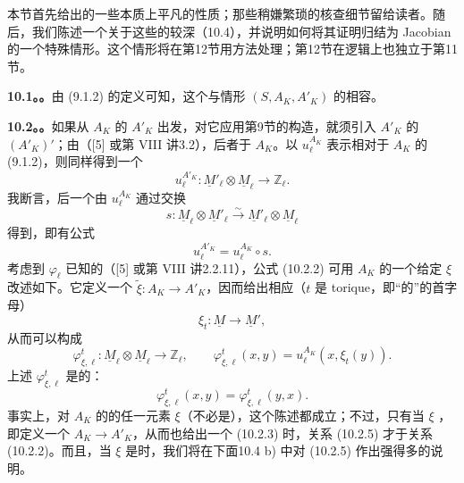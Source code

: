 本节首先给出的一些本质上平凡的性质；那些稍嫌繁琐的核查细节留给读者。随后，我们陈述一个关于这些的较深（10.4），并说明如何将其证明归结为 Jacobian 的一个特殊情形。这个情形将在第12节用方法处理；第12节在逻辑上也独立于第11节。

\textbf{10.1。。}由 (9.1.2) 的定义可知，这个与情形 $(S,A_K,A'_K)$ 的相容。

\textbf{10.2。。}如果从 $A_K$ 的 $A'_K$ 出发，对它应用第9节的构造，就须引入 $A'_K$ 的 $(A'_K)'$；由（[5] 或第 VIII 讲3.2），后者于 $A_K$。以 $u_\ell^{A_K}$ 表示相对于 $A_K$ 的 (9.1.2)，则同样得到一个
\begin{equation}\tag{10.2.1}
 u_\ell^{A'_K}:\underline M'_\ell\otimes\underline M_\ell\longrightarrow\mathbb Z_\ell.
\end{equation}
我断言，后一个由 $u_\ell^{A_K}$ 通过交换
\[
 s:\underline M_\ell\otimes\underline M'_\ell\xrightarrow{\sim}\underline M'_\ell\otimes\underline M_\ell
\]
得到，即有公式
\begin{equation}\tag{10.2.2}
 u_\ell^{A'_K}=u_\ell^{A_K}\circ s.
\end{equation}
考虑到 $\varphi_\ell$ 已知的（[5] 或第 VIII 讲2.2.11），公式 (10.2.2) 可用 $A_K$ 的一个给定 $\xi$ 改述如下。它定义一个 $\widetilde\xi:A_K\longrightarrow A'_K$，因而给出相应（$t$ 是 torique，即“的”的首字母）
\begin{equation}\tag{10.2.3}
 \xi_t:\underline M\longrightarrow\underline M',
\end{equation}
从而可以构成
\begin{equation}\tag{10.2.4}
 \varphi^t_{\xi,\ell}:\underline M_\ell\otimes\underline M_\ell\longrightarrow\mathbb Z_\ell,
 \qquad \varphi^t_{\xi,\ell}(x,y)=u_\ell^{A_K}(x,\xi_t(y)).
\end{equation}
上述 $\varphi^t_{\xi,\ell}$ 是的：
\begin{equation}\tag{10.2.5}
 \varphi^t_{\xi,\ell}(x,y)=\varphi^t_{\xi,\ell}(y,x).
\end{equation}
事实上，对 $A_K$ 的的任一元素 $\xi$（不必是），这个陈述都成立；不过，只有当 $\xi$ ，即定义一个 $A_K\longrightarrow A'_K$，从而也给出一个 (10.2.3) 时，关系 (10.2.5) 才于关系 (10.2.2)。而且，当 $\xi$ 是时，我们将在下面10.4 b) 中对 (10.2.5) 作出强得多的说明。

